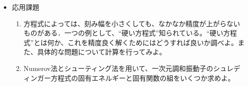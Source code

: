 \documentclass[11pt]{jarticle}
\begin{document}
\begin{itemize}
\item 応用課題
  \begin{enumerate}
  \item 方程式によっては、刻み幅を小さくしても、なかなか精度が上がらないものがある．一つの例として、``硬い方程式''知られている。``硬い方程式''とは何か、これを精度良く解くためにはどうすれば良いか調べよ。また、具体的な問題について計算を行ってみよ。
  \item Numerov法とシューティング法を用いて、一次元調和振動子のシュレディンガー方程式の固有エネルギーと固有関数の組をいくつか求めよ。
  \end{enumerate}  
\end{itemize}
\end{document}
